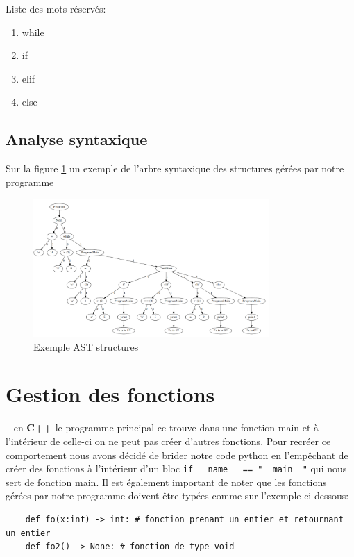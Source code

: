 Liste des mots réservés:

\begin{enumerate}
    \item while
    \item if
    \item elif
    \item else
\end{enumerate}

\subsection*{Analyse syntaxique}

Sur la figure \ref{exemple_struct} un exemple de l'arbre syntaxique des structures gérées par notre programme

\begin{figure}[h]
    \centering
    \includegraphics[width=0.8\textwidth]{./images/exemple_ast_struct.png}
    \caption{Exemple AST structures}\label{exemple_struct}
\end{figure}

\section{Gestion des fonctions}
~\label{section:Fonctions}
en \textbf{C++} le programme principal ce trouve dans une fonction main et à l'intérieur de celle-ci on ne peut pas créer d'autres fonctions.
Pour recréer ce comportement nous avons décidé de brider notre code python en l'empêchant de créer des fonctions
à l'intérieur d'un bloc \verb|if __name__ == "__main__"| qui nous sert de fonction main.
\newline
\newline
Il est également important de noter que les fonctions gérées par notre programme doivent être typées comme sur l'exemple ci-dessous:
\lstset{language=Python}
\begin{lstlisting}
    def fo(x:int) -> int: # fonction prenant un entier et retournant un entier
    def fo2() -> None: # fonction de type void
    \end{lstlisting}


